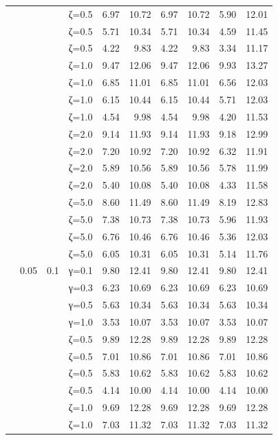 \begin{table}[htbp]
\begin{tabular}{ll r l  rr  rr  rr}
  &  &  & ζ=0.5 & 6.97 & 10.72 & 6.97 & 10.72 & 5.90 & 12.01 \\
  &  &  & ζ=0.5 & 5.71 & 10.34 & 5.71 & 10.34 & 4.59 & 11.45 \\
  &  &  & ζ=0.5 & 4.22 & 9.83 & 4.22 & 9.83 & 3.34 & 11.17 \\
  &  &  & ζ=1.0 & 9.47 & 12.06 & 9.47 & 12.06 & 9.93 & 13.27 \\
  &  &  & ζ=1.0 & 6.85 & 11.01 & 6.85 & 11.01 & 6.56 & 12.03 \\
  &  &  & ζ=1.0 & 6.15 & 10.44 & 6.15 & 10.44 & 5.71 & 12.03 \\
  &  &  & ζ=1.0 & 4.54 & 9.98 & 4.54 & 9.98 & 4.20 & 11.53 \\
  &  &  & ζ=2.0 & 9.14 & 11.93 & 9.14 & 11.93 & 9.18 & 12.99 \\
  &  &  & ζ=2.0 & 7.20 & 10.92 & 7.20 & 10.92 & 6.32 & 11.91 \\
  &  &  & ζ=2.0 & 5.89 & 10.56 & 5.89 & 10.56 & 5.78 & 11.99 \\
  &  &  & ζ=2.0 & 5.40 & 10.08 & 5.40 & 10.08 & 4.33 & 11.58 \\
  &  &  & ζ=5.0 & 8.60 & 11.49 & 8.60 & 11.49 & 8.19 & 12.83 \\
  &  &  & ζ=5.0 & 7.38 & 10.73 & 7.38 & 10.73 & 5.96 & 11.93 \\
  &  &  & ζ=5.0 & 6.76 & 10.46 & 6.76 & 10.46 & 5.36 & 12.03 \\
  &  &  & ζ=5.0 & 6.05 & 10.31 & 6.05 & 10.31 & 5.14 & 11.76 \\
  & 0.05 & 0.1 & γ=0.1 & 9.80 & 12.41 & 9.80 & 12.41 & 9.80 & 12.41 \\
  &  &  & γ=0.3 & 6.23 & 10.69 & 6.23 & 10.69 & 6.23 & 10.69 \\
  &  &  & γ=0.5 & 5.63 & 10.34 & 5.63 & 10.34 & 5.63 & 10.34 \\
  &  &  & γ=1.0 & 3.53 & 10.07 & 3.53 & 10.07 & 3.53 & 10.07 \\
  &  &  & ζ=0.5 & 9.89 & 12.28 & 9.89 & 12.28 & 9.89 & 12.28 \\
  &  &  & ζ=0.5 & 7.01 & 10.86 & 7.01 & 10.86 & 7.01 & 10.86 \\
  &  &  & ζ=0.5 & 5.83 & 10.62 & 5.83 & 10.62 & 5.83 & 10.62 \\
  &  &  & ζ=0.5 & 4.14 & 10.00 & 4.14 & 10.00 & 4.14 & 10.00 \\
  &  &  & ζ=1.0 & 9.69 & 12.28 & 9.69 & 12.28 & 9.69 & 12.28 \\
  &  &  & ζ=1.0 & 7.03 & 11.32 & 7.03 & 11.32 & 7.03 & 11.32 \\

\end{tabular}
\end{table}
